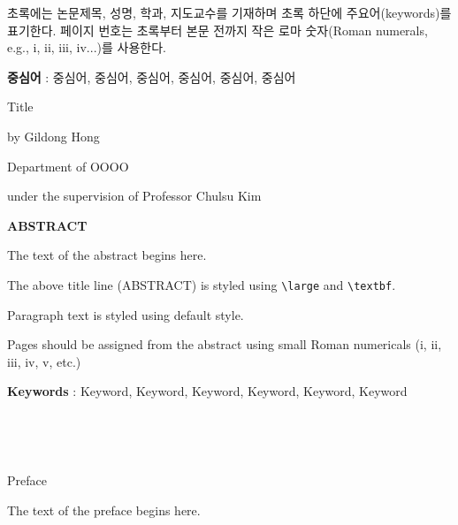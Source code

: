 \documentclass[11pt]{report}
\theoremstyle{plain}
\theoremstyle{definition}
\theoremstyle{corollary}
\theoremstyle{definition}
\theoremstyle{plain}
\theoremstyle{definition}
\theoremstyle{plain}
\begin{document}
초록에는 논문제목, 성명, 학과, 지도교수를 기재하며 초록 하단에 주요어(keywords)를 표기한다. 
페이지 번호는 초록부터 본문 전까지 작은 로마 숫자(Roman numerals, e.g., i, ii, iii, iv...)를 사용한다.

\par\vspace{100pt}

\textbf{중심어} : 중심어, 중심어, 중심어, 중심어, 중심어, 중심어


\newpage
\begin{center}
\LARGE Title
\par\vspace{20pt}
\normalsize by Gildong Hong\par
Department of OOOO\par
under the supervision of Professor Chulsu Kim

\par\vspace{20pt}

\large \textbf{ABSTRACT}
\end{center}
\normalsize
The text of the abstract begins here. 

The above title line (ABSTRACT) is styled using \verb|\large| and  \verb|\textbf|.

Paragraph text is styled using default style.

Pages should be assigned from the abstract using small Roman numericals (i, ii, iii, iv, v, etc.)

\par\vspace{100pt}

\textbf{Keywords} : Keyword, Keyword, Keyword, Keyword, Keyword, Keyword

\newpage
~ %

\newpage
~

\newpage
\begin{center}
\large
Preface
\end{center}
\normalsize
The text of the preface begins here. 

\end{document}
